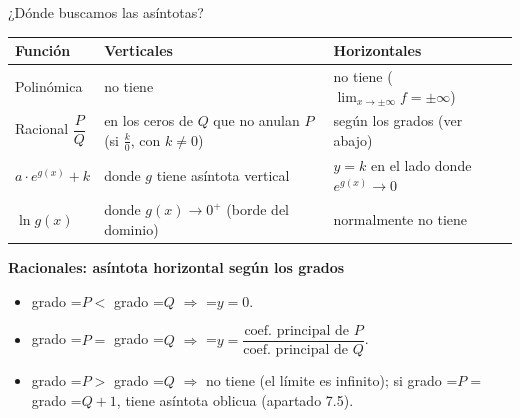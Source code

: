 \documentclass[11pt,a4paper]{article}
\newcommand{\lt}{<}\newcommand{\gt}{>}
\newcommand{\fmm}[1]{\setbox0=\hbox{$#1$}\ifdim\wd0>\linewidth\[#1\]\else\mbox{\box0}\fi}
\newcommand{\fmuline}[1]{\textbf{\color{fmaccent}#1}}
\begin{document}
  
\begin{fmprop}{¿Dónde buscamos las asíntotas?}
\begin{center}\renewcommand{\arraystretch}{1.35}\small\begin{tabularx}{\linewidth}{>{\raggedright\arraybackslash}p{2.4cm}>{\raggedright\arraybackslash}X>{\raggedright\arraybackslash}p{5.3cm}}\toprule
\textbf{Función} & \textbf{Verticales} & \textbf{Horizontales}\\\midrule
Polinómica & no tiene & no tiene ($\lim_{x\to\pm\infty}f=\pm\infty$)\\[3pt]
Racional $\dfrac{P}{Q}$ & en los ceros de $Q$ que no anulan $P$ (si $\frac{k}{0}$, con $k\neq0$) & según los grados (ver abajo)\\[3pt]
$a\cdot e^{g(x)}+k$ & donde $g$ tiene asíntota vertical & $y=k$ en el lado donde $e^{g(x)}\to0$\\[3pt]
$\ln g(x)$ & donde $g(x)\to0^+$ (borde del dominio) & normalmente no tiene\\[3pt]
\bottomrule\end{tabularx}\end{center}

      

\fmuline{Racionales: asíntota horizontal según los grados}

      
\begin{itemize}
\item grado \fmm{P\lt} grado \fmm{Q} $\Rightarrow$ \fmm{y=0}.
\item grado \fmm{P=} grado \fmm{Q} $\Rightarrow$ \fmm{y=\dfrac{\text{coef. principal de }P}{\text{coef. principal de }Q}}.
\item grado \fmm{P\gt} grado \fmm{Q} $\Rightarrow$ no tiene (el límite es infinito); si grado \fmm{P=} grado \fmm{Q+1}, tiene asíntota oblicua (apartado 7.5).
\end{itemize}
\end{fmprop}
\end{document}
